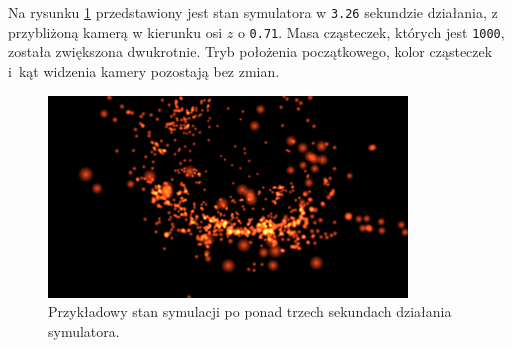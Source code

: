 \documentclass[12pt, twoside, openany]{report}
\begin{document}

Na rysunku \ref{fig:stan2} przedstawiony jest stan symulatora w \texttt{3.26} sekundzie działania, z przybliżoną kamerą w kierunku osi $z$ o \texttt{0.71}. Masa cząsteczek, których jest \texttt{1000}, została zwiększona dwukrotnie. Tryb położenia początkowego, kolor cząsteczek i~kąt widzenia kamery pozostają bez zmian.


\begin{figure}[H]
\centering
\includegraphics[width=0.85\textwidth,height=\textheight,keepaspectratio]{1_045.png}
\caption{Przykładowy stan symulacji po ponad trzech sekundach działania symulatora.}
\label{fig:stan2}
\end{figure}
\end{document}
